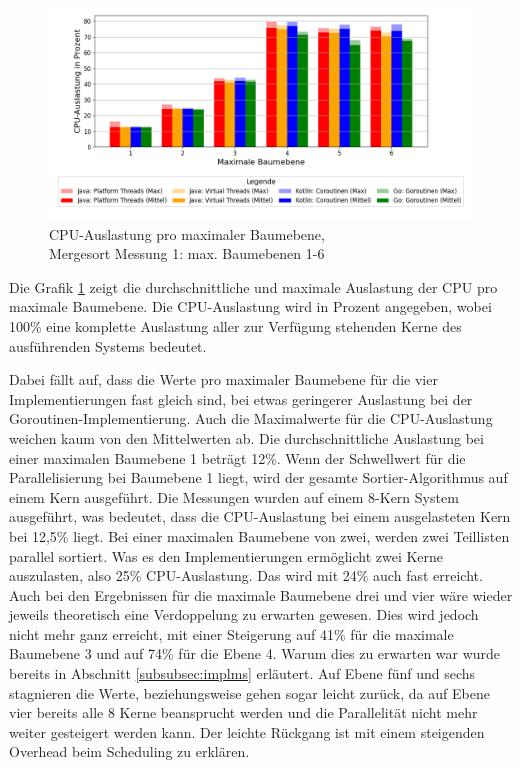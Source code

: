\documentclass[fontsize=12pt,paper=a4,twoside=semi,parskip=half-,headsepline,headinclude]{scrreprt}
\begin{document}
\begin{figure}[H]
	\centering
	\includegraphics[scale=0.5]{figures/mergesort/Maximalebauebenen1-6/cpu_usage_bar_plot.png}
	\caption{CPU-Auslastung pro maximaler Baumebene,\\ Mergesort Messung 1: max. Baumebenen 1-6}
	\label{fig:ms1-6CPU}
\end{figure}

Die Grafik \ref{fig:ms1-6CPU} zeigt die durchschnittliche und maximale Auslastung der CPU pro maximale Baumebene. Die CPU-Auslastung wird in Prozent angegeben, wobei 100\% eine komplette Auslastung aller zur Verfügung stehenden Kerne des ausführenden Systems bedeutet.

Dabei fällt auf, dass die Werte pro maximaler Baumebene für die vier Implementierungen fast gleich sind, bei etwas geringerer Auslastung bei der Goroutinen-Implementierung. Auch die Maximalwerte für die CPU-Auslastung weichen kaum von den Mittelwerten ab. Die durchschnittliche Auslastung bei einer maximalen Baumebene 1 beträgt 12\%. Wenn der Schwellwert für die Parallelisierung bei Baumebene 1 liegt, wird der gesamte Sortier-Algorithmus auf einem Kern ausgeführt. Die Messungen wurden auf einem 8-Kern System ausgeführt, was bedeutet, dass die CPU-Auslastung bei einem ausgelasteten Kern bei 12,5\% liegt. Bei einer maximalen 
Baumebene von zwei, werden zwei Teillisten parallel sortiert. Was es den Implementierungen ermöglicht zwei Kerne auszulasten, also 25\% CPU-Auslastung. Das wird mit 24\% auch fast erreicht. Auch bei den Ergebnissen für die maximale Baumebene drei und vier wäre wieder jeweils theoretisch eine Verdoppelung zu erwarten gewesen. Dies wird jedoch nicht mehr ganz erreicht, mit einer Steigerung auf 41\% für die maximale Baumebene 3 und auf 74\% für die Ebene 4. Warum dies zu erwarten war wurde bereits in Abschnitt \ref{subsubsec:implms} erläutert. Auf Ebene fünf und sechs stagnieren die Werte, beziehungsweise gehen sogar leicht zurück, da auf Ebene vier bereits alle 8 Kerne beansprucht werden und die Parallelität nicht mehr weiter gesteigert werden kann. Der leichte Rückgang ist mit einem steigenden Overhead beim Scheduling zu erklären.
\end{document}
